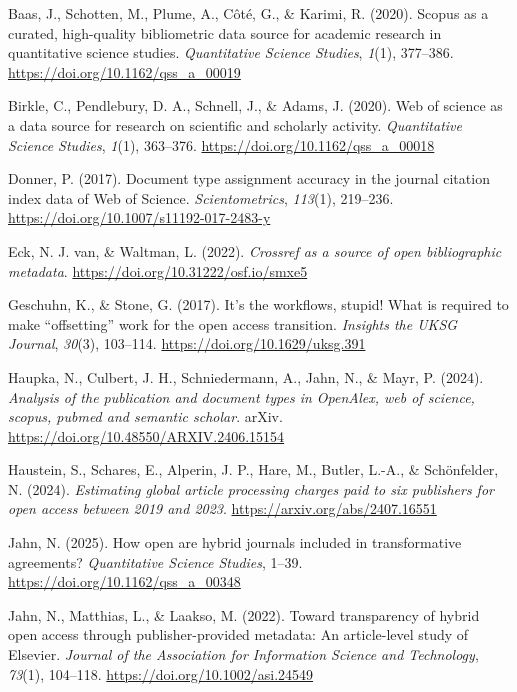 \documentclass[a4paper,man,floatsintext,longtable,noextraspace,10pt]{apa6}
\newlength{\cslhangindent}
\newenvironment{CSLReferences}[2] %
{\begin{list}{}{%
  \setlength{\itemindent}{0pt}
  \setlength{\leftmargin}{0pt}
  \setlength{\parsep}{0pt}
  \ifodd #1
  \setlength{\leftmargin}{\cslhangindent}
  \setlength{\itemindent}{-1\cslhangindent}
  \fi
  \setlength{\itemsep}{#2\baselineskip}}}
{\end{list}}
\begin{document}
\label{refs}
\begin{CSLReferences}{1}{0}
Baas, J., Schotten, M., Plume, A., Côté, G., \& Karimi, R. (2020).
Scopus as a curated, high-quality bibliometric data source for academic
research in quantitative science studies. \emph{Quantitative Science
Studies}, \emph{1}(1), 377--386.
\url{https://doi.org/10.1162/qss_a_00019}

Birkle, C., Pendlebury, D. A., Schnell, J., \& Adams, J. (2020). Web of
science as a data source for research on scientific and scholarly
activity. \emph{Quantitative Science Studies}, \emph{1}(1), 363--376.
\url{https://doi.org/10.1162/qss_a_00018}

Donner, P. (2017). Document type assignment accuracy in the journal
citation index data of {Web of Science}. \emph{Scientometrics},
\emph{113}(1), 219--236. \url{https://doi.org/10.1007/s11192-017-2483-y}

Eck, N. J. van, \& Waltman, L. (2022). \emph{Crossref as a source of
open bibliographic metadata}.
\url{https://doi.org/10.31222/osf.io/smxe5}

Geschuhn, K., \& Stone, G. (2017). It's the workflows, stupid! What is
required to make {``offsetting''} work for the open access transition.
\emph{Insights the {UKSG} Journal}, \emph{30}(3), 103--114.
\url{https://doi.org/10.1629/uksg.391}

Haupka, N., Culbert, J. H., Schniedermann, A., Jahn, N., \& Mayr, P.
(2024). \emph{Analysis of the publication and document types in
OpenAlex, web of science, scopus, pubmed and semantic scholar}. arXiv.
\url{https://doi.org/10.48550/ARXIV.2406.15154}

Haustein, S., Schares, E., Alperin, J. P., Hare, M., Butler, L.-A., \&
Schönfelder, N. (2024). \emph{Estimating global article processing
charges paid to six publishers for open access between 2019 and 2023}.
\url{https://arxiv.org/abs/2407.16551}

Jahn, N. (2025). How open are hybrid journals included in transformative
agreements? \emph{Quantitative Science Studies}, 1--39.
\url{https://doi.org/10.1162/qss_a_00348}

Jahn, N., Matthias, L., \& Laakso, M. (2022). Toward transparency of
hybrid open access through publisher-provided metadata: An article-level
study of {Elsevier}. \emph{Journal of the Association for Information
Science and Technology}, \emph{73}(1), 104--118.
\url{https://doi.org/10.1002/asi.24549}


\end{CSLReferences}
\end{document}
